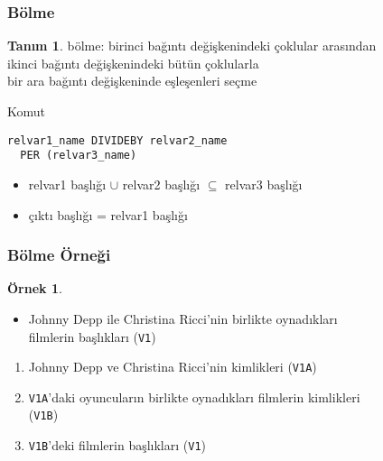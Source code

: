 \documentclass[dvipsnames]{beamer}
\theoremstyle{definition}
\newtheorem{tanim}[theorem]{Tanım}
\theoremstyle{example}
\newtheorem{ornek}[theorem]{Örnek}
\theoremstyle{plain}
\begin{document}
\begin{frame}[fragile]
  \frametitle{Bölme}

  \begin{tanim}
    \alert{bölme}:  birinci bağıntı değişkenindeki çoklular arasından\\
      ikinci bağıntı değişkenindeki bütün çoklularla\\
      bir ara bağıntı değişkeninde eşleşenleri seçme
  \end{tanim}

  \pause
  \begin{block}{Komut}
    \begin{lstlisting}
relvar1_name DIVIDEBY relvar2_name
  PER (relvar3_name)
    \end{lstlisting}
  \end{block}

  \pause
  \begin{itemize}
    \item relvar1 başlığı $\cup$ relvar2 başlığı $\subseteq$ relvar3 başlığı

    \pause
    \item çıktı başlığı = relvar1 başlığı
  \end{itemize}
\end{frame}

\begin{frame}
  \frametitle{Bölme Örneği}

  \begin{ornek}
    \begin{itemize}
      \item Johnny Depp ile Christina Ricci'nin birlikte oynadıkları\\
        filmlerin başlıkları (\texttt{V1})
    \end{itemize}

    \pause
    \begin{enumerate}
      \item Johnny Depp ve Christina Ricci'nin kimlikleri (\texttt{V1A})

      \pause
      \item \texttt{V1A}'daki oyuncuların birlikte oynadıkları filmlerin
        kimlikleri\\
        (\texttt{V1B})

      \pause
      \item \texttt{V1B}'deki filmlerin başlıkları (\texttt{V1})
    \end{enumerate}
  \end{ornek}
\end{frame}
\end{document}
